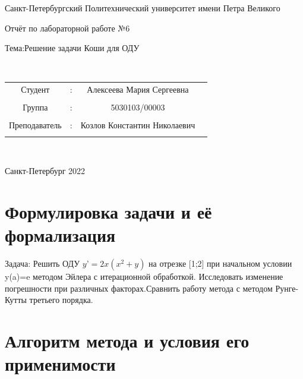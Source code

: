 \documentclass[a4paper]{article}
\begin{document}
\begin{center} 
\hfill \break 
\large{Санкт-Петербургский Политехнический университет имени Петра Великого}\\ 
 
 \hfill \break 
\hfill\break 
\hfill \break 
\hfill \break 
\hfill \break 
\begin{center}\large{Отчёт по лабораторной работе №6} \end{center}  
\hfill \break 
\large{Тема:Решение задачи Коши для ОДУ} 
\hfill \break 
\hfill \break 
 
\hfill \break 
\hfill \break 
\\ 
\hfill \break 
\hfill \break 
\end{center} 


\normalsize{ 
\begin{tabular}{cccc} 
Студент & : & Алексеева Мария Сергеевна\\\\ 
Группа & : & 5030103/00003 \\\\ 
Преподаватель & : & Козлов Константин Николаевич \\\\ 
\end{tabular} 
}\\ 
\hfill \break 
\hfill \break 
\hfill \break 
\begin{center} Санкт-Петербург 2022 \end{center} 
\thispagestyle{empty} %
 
\newpage 
	
\section{Формулировка задачи и её формализация} 
Задача: Решить ОДУ $y’=2x(x^2+y)$ на отрезке [1;2] при начальном условии y(a)=e методом Эйлера с итерационной обработкой. Исследовать изменение погрешности при различных факторах.Сравнить работу метода с методом Рунге-Кутты третьего порядка.
\section{Алгоритм метода и условия его применимости} 
\end{document}
